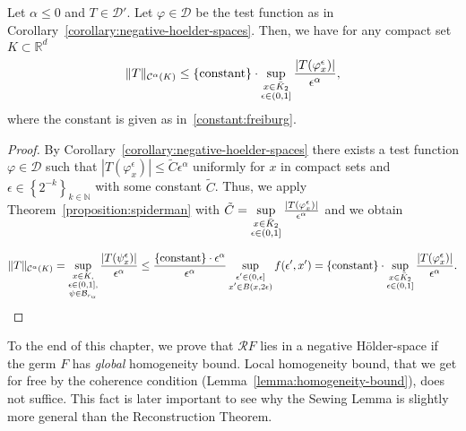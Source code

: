 \begin{corollary}\label{corollary:c-alpha-norm-estimate}
  Let \( \alpha \leq 0 \) and \( T \in \mathcal{D}' \). Let \( \varphi \in \mathcal{D} \) be the test function as in Corollary~\ref{corollary:negative-hoelder-spaces}. Then, we have for any compact set \( K \subset \mathbb{R}^d \)
  \begin{align*}
    \lVert T \rVert_{\mathcal{C}^\alpha(K)} \leq \{ \mathrm{constant} \} \cdot \sup_{\substack{x \in \bar{K}_{2} \\ \epsilon \in (0,1]}} 
    \frac{|T(\varphi^{\epsilon}_x)|}{\epsilon^\alpha},
  \end{align*}
  where the constant is given as in~\eqref{constant:freiburg}.
\end{corollary}

\begin{proof}
  By Corollary~\ref{corollary:negative-hoelder-spaces} there exists a test function \( \varphi \in \mathcal{D} \) such that \( |T(\varphi^\epsilon_x)| \leq \tilde C \epsilon^\alpha  \) uniformly for \( x \) in compact sets and \( \epsilon \in \left\{ 2^{-k} \right\}_{k \in \mathbb{N}} \) with some constant \( \tilde C \). Thus, we apply Theorem~\ref{proposition:spiderman} with \( \tilde C = \sup\limits_{\substack{x \in \bar{K}_{2} \\ \epsilon \in (0,1]}} \frac{|T(\varphi^{\epsilon}_x)|}{\epsilon^\alpha} \) and we obtain


  \begin{align*}
    \lVert T \rVert_{\mathcal{C}^\alpha(K)} 
    = \sup_{
      \substack{
        x \in K,\\
        \epsilon \in (0,1],\\
        \psi \in \mathcal{B}_{r_\alpha}
      }
    } \frac{|T(\psi^\epsilon_x)|}{\epsilon^\alpha}
    \leq 
    \frac{
      \{ \mathrm{constant} \} \cdot \epsilon^\alpha
    }{
      \epsilon^\alpha
    }
    \sup\limits_{
        \substack{
          \epsilon' \in (0, \epsilon]\\
          x' \in B(x, 2\epsilon)
        }
      } f(\epsilon', x') = \{ \mathrm{constant} \} \cdot \sup_{\substack{x \in \bar{K}_{2} \\ \epsilon \in (0,1]}} 
      \frac{|T(\varphi^{\epsilon}_x)|}{\epsilon^\alpha}.
  \end{align*}
\end{proof}

To the end of this chapter, we prove that  \( \mathcal{R}F \) lies in a negative Hölder-space if the germ \( F \) has \emph{global} homogeneity bound. Local homogeneity bound, that we get for free by the coherence condition (Lemma~\ref{lemma:homogeneity-bound}), does not suffice. This fact is later important to see why the Sewing Lemma is slightly more general than the Reconstruction Theorem.

